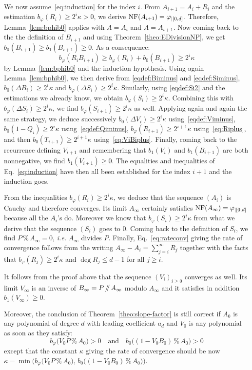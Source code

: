 \documentclass{sig-alternate-05-2015}
\newcommand{\NF}{\text{\rm NF}}
\renewcommand{\mod}{\,\%\,}
\renewcommand{\div}{\,/\hspace{-0.3em}/\,}
\begin{document}
We now assume~\eqref{eq:induction} for the index $i$.
From $A_{i+1} = A_i + R_i$ and the estimation $b_\varphi(R_i) \geq 2^i 
\kappa > 0$, we derive $\NF(A_{i+1}) = \varphi_{|[0,d]}$. Therefore,
Lemma~\ref{lem:bphib0} applies with $A = A_i$ and $A = A_{i+1}$.
Now coming back to the the definition of $B_{i+1}$ and using
Theorem~\ref{theo:EDivisionNP}, we get $b_0(B_{i+1}) \geq b_1(B_{i+1}) 
\geq 0$. As a consequence:
$$b_\varphi(R_i B_{i+1}) \geq b_\varphi(R_i) + b_0(B_{i+1})
\geq 2^i \kappa$$
by Lemma~\ref{lem:bphib0} and the induction hypothesis.
Using again Lemma~\ref{lem:bphib0}, we then derive from 
\eqref{eqdef:Biminus} and \eqref{eqdef:Siminus}, $b_0(\Delta B_i) \geq 
2^i \kappa$ and $b_\varphi(\Delta S_i) \geq 2^i \kappa$.
Similarly, using \eqref{eqdef:Si2} and the estimations we already know,
we obtain $b_\varphi(S_i) \geq 2^i \kappa$. Combining this with
$b_\varphi(\Delta S_i) \geq 2^i \kappa$, we find
$b_\varphi(S_{i+1}) \geq 2^i \kappa$ as well. Applying again and again
the same strategy, we deduce successively
$b_0(\Delta V_i) \geq 2^i \kappa$ using~\eqref{eqdef:Viminus},
$b_0(1{-}Q_i) \geq 2^i \kappa$ using~\eqref{eqdef:Qiminus},
$b_\varphi(R_{i+1}) \geq 2^{i+1} \kappa$ using~\eqref{eq:Riplus},
and then $b_0(T_{i+1}) \geq 2^{i+1} \kappa$
using~\eqref{eq:ViBiplus}. Finally, coming back to the recurrence
defining $V_{i+1}$ and remembering that $b_1(V_i)$ and $b_1(B_{i+1})$
are both nonnegative, we find $b_1(V_{i+1}) \geq 0$.
The equalities and inequalities
of Eq.~\eqref{eq:induction} have then all been established for
the index $i+1$ and the induction goes.

From the inequalities $b_\varphi(R_i) \geq 2^i \kappa$, we deduce that 
the sequence $(A_i)$ is Cauchy and therefore converges. Its limit 
$A_\infty$ certainly satisfies $\NF(A_\infty) = \varphi_{|[0,d]}$ because 
all the $A_i$'s do. Moreover we know that $b_\varphi(S_i) \geq 2^i 
\kappa$ from what we derive that the sequence $(S_i)$ goes to $0$.
Coming back to the definition of $S_i$, we find $P \mod A_\infty = 0$,
\emph{i.e.} $A_\infty$ divides $P$. Finally, Eq.~\eqref{eq:rateconv}
giving the rate of convergence follows from the writing
$A_\infty{-}A_i = \sum_{j=i}^\infty R_j$
together with the facts that $b_\varphi(R_j) \geq 2^i \kappa$ and $\deg 
R_j \leq d{-}1$ for all $j \geq i$.

\begin{rem}
\label{rem:slope-factor}
It follows from the proof above that the sequence $(V_i)_{i \geq 0}$
converges as well. Its limit $V_\infty$ is an inverse of $B_\infty
= P \div A_\infty$ modulo $A_\infty$ and it satisfies in addition
$b_1(V_\infty) \geq 0$.

Moreover, the conclusion of 
Theorem~\ref{theo:slope-factor} is still correct if $A_0$ is any 
polynomial of degree $d$ with leading coefficient $a_d$ and $V_0$
is any polynomial as soon as they satisfy:
$$b_\varphi\big(V_0 P \mod A_0\big) > 0
\quad \text{and} \quad
b_0\big((1 - V_0 B_0) \mod A_0\big) > 0$$
except that the constant $\kappa$ giving the rate of convergence
should be now
$\kappa = \min \big( 
b_\varphi\big(V_0 P \mod A_0\big), \,
b_0\big((1 - V_0 B_0) \mod A_0\big)\big)$.
\end{rem}
\end{document}
